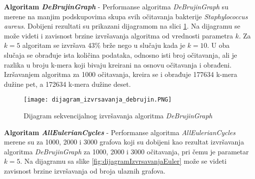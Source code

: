 \documentclass[12pt,oneside]{memoir}
\begin{document}


\textbf{Algoritam \textit{DeBrujinGraph}} - Performanse algoritma \textit{DeBrujinGraph} su merene na manjim podskupovima skupa svih očitavanja bakterije \textit{Staphylococcus aureus}. Dobijeni rezultati su prikazani dijagramom na slici \ref{fig:dijagramIzvrsavanjaDebrujin}. Na dijagramu se može videti i zavisnost brzine izvršavanja algoritma od vrednosti parametra $k$. Za $k = 5$ algoritam se izvršava 43$\%$ brže nego u slučaju kada je $k = 10$. U oba slučaja se obrađuje ista količina podataka, odnosno isti broj očitavanja, ali je razlika u broju k-mera koji bivaju kreirani na osnovu očitavanja i obrađeni. Izršavanjem algoritma za 1000 očitavanja, kreira se i obrađuje 177634 k-mera dužine pet, a 172634 k-mera dužine deset.

\begin{figure}[!ht]
  \centering
  \texttt{[image: dijagram\_izvrsavanja\_debrujin.PNG]}
  \caption{Dijagram sekvencijalnog izvršavanja algoritma \textit{DeBrujinGraph}}
  \label{fig:dijagramIzvrsavanjaDebrujin}
\end{figure}

\textbf{Algoritam \textit{AllEulerianCycles}} - Performanse algoritma \textit{AllEulerianCycles} merene su za 1000, 2000 i 3000 grafova koji su dobijeni kao rezultat izvršavanja algoritma \textit{DeBrujinGraph} za 1000, 2000 i 3000 očitavanja, pri čemu je parametar $k = 5$. Na dijagramu sa slike \ref{fig:dijagramIzvrsavanjaEuler} može se videti zavisnost brzine izvršavanja od broja ulaznih grafova.
\end{document}
